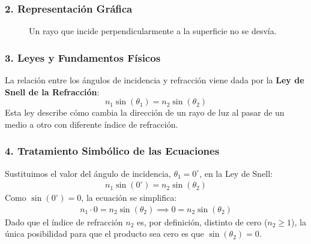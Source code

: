 \subsubsection*{2. Representación Gráfica}
\begin{figure}[H]
    \centering
    \caption{Un rayo que incide perpendicularmente a la superficie no se desvía.}
\end{figure}

\subsubsection*{3. Leyes y Fundamentos Físicos}
La relación entre los ángulos de incidencia y refracción viene dada por la \textbf{Ley de Snell de la Refracción}:
$$ n_1 \sin(\theta_1) = n_2 \sin(\theta_2) $$
Esta ley describe cómo cambia la dirección de un rayo de luz al pasar de un medio a otro con diferente índice de refracción.

\subsubsection*{4. Tratamiento Simbólico de las Ecuaciones}
Sustituimos el valor del ángulo de incidencia, $\theta_1 = 0^\circ$, en la Ley de Snell:
\begin{gather}
    n_1 \sin(0^\circ) = n_2 \sin(\theta_2)
\end{gather}
Como $\sin(0^\circ) = 0$, la ecuación se simplifica:
\begin{gather}
    n_1 \cdot 0 = n_2 \sin(\theta_2) \implies 0 = n_2 \sin(\theta_2)
\end{gather}
Dado que el índice de refracción $n_2$ es, por definición, distinto de cero ($n_2 \ge 1$), la única posibilidad para que el producto sea cero es que $\sin(\theta_2) = 0$.

